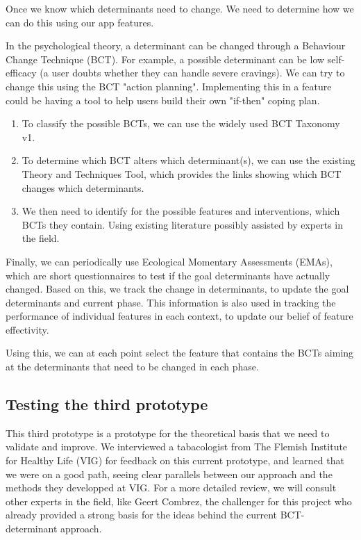 Once we know which determinants need to change. We need to determine how we can do this using our app features.

In the psychological theory, a determinant can be changed through a Behaviour Change Technique (BCT). 
For example, a possible determinant can be low self-efficacy (a user doubts whether they can handle severe cravings).
We can try to change this using the BCT "action planning". 
Implementing this in a feature could be having a tool to help users build their own "if-then" coping plan.

\begin{enumerate}
    \item To classify the possible BCTs, we can use the widely used BCT Taxonomy v1. 
    \item To determine which BCT alters which determinant(s), we can use the existing Theory and Techniques Tool, which provides the links showing which BCT changes which determinants.
    \item We then need to identify for the possible features and interventions, which BCTs they contain. Using existing literature possibly assisted by experts in the field.
\end{enumerate}

Finally, we can periodically use Ecological Momentary Assessments (EMAs), 
which are short questionnaires to test if the goal determinants have actually changed. 
Based on this, we track the change in determinants, to update the goal determinants and current phase.
This information is also used in tracking the performance of individual features in each context,
to update our belief of feature effectivity. 

Using this, we can at each point select the feature that contains the BCTs aiming at the determinants that need to be changed in each phase.

\subsection{Testing the third prototype}
This third prototype is a prototype for the theoretical basis that we need to validate and improve.
We interviewed a tabacologist from The Flemish Institute for Healthy Life (VIG) for feedback on this current prototype, and learned that we were on a good path,
seeing clear parallels between our approach and the methods they developped at VIG.
For a more detailed review,
we will consult other experts in the field, like Geert Combrez, the challenger for this project who already provided
a strong basis for the ideas behind the current BCT-determinant approach.
